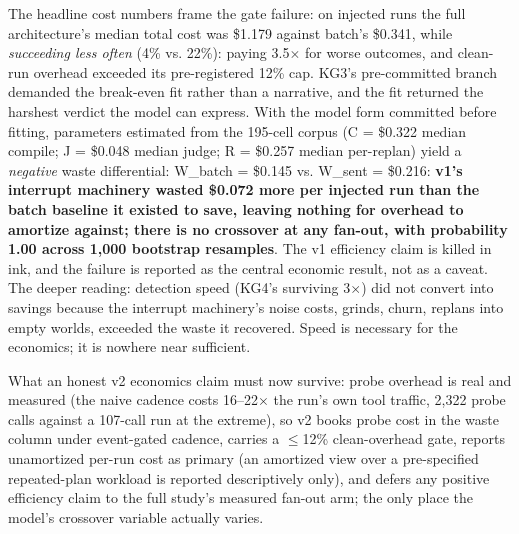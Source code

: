 \documentclass[acmsmall,screen,review,anonymous]{acmart}
\begin{document}
The headline cost numbers frame the gate failure: on injected runs the full architecture's median total cost was \$1.179 against batch's \$0.341, while \emph{succeeding less often} (4\% vs. 22\%): paying 3.5$\times$ for worse outcomes, and clean-run overhead exceeded its pre-registered 12\% cap. KG3's pre-committed branch demanded the break-even fit rather than a narrative, and the fit returned the harshest verdict the model can express. With the model form committed before fitting, parameters estimated from the 195-cell corpus (C = \$0.322 median compile; J = \$0.048 median judge; R = \$0.257 median per-replan) yield a \emph{negative} waste differential: W\_batch = \$0.145 vs. W\_sent = \$0.216: \textbf{v1's interrupt machinery wasted \$0.072 more per injected run than the batch baseline it existed to save, leaving nothing for overhead to amortize against; there is no crossover at any fan-out, with probability 1.00 across 1,000 bootstrap resamples}. The v1 efficiency claim is killed in ink, and the failure is reported as the central economic result, not as a caveat. The deeper reading: detection speed (KG4's surviving 3$\times$) did not convert into savings because the interrupt machinery's noise costs, grinds, churn, replans into empty worlds, exceeded the waste it recovered. Speed is necessary for the economics; it is nowhere near sufficient.

What an honest v2 economics claim must now survive: probe overhead is real and measured (the naive cadence costs 16--22$\times$ the run's own tool traffic, 2,322 probe calls against a 107-call run at the extreme), so v2 books probe cost in the waste column under event-gated cadence, carries a $\le$12\% clean-overhead gate, reports unamortized per-run cost as primary (an amortized view over a pre-specified repeated-plan workload is reported descriptively only), and defers any positive efficiency claim to the full study's measured fan-out arm; the only place the model's crossover variable actually varies.
\end{document}
